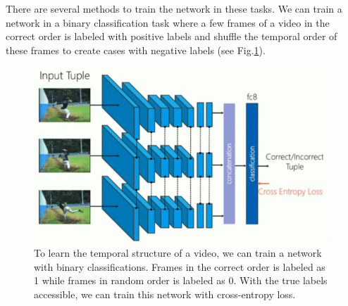 There are several methods to train the network in these tasks.
We can train a network in a binary classification task where a few frames of a video in the correct order is labeled with positive labels and shuffle the temporal order of these frames to create cases with negative labels (see Fig.\ref{fig:shuffle-learn}). 


\begin{figure}[H]
  \includegraphics[width=\linewidth]{lectures/13-a/shuffle-learn.png}
    \caption{To learn the temporal structure of a video, we can train a network with binary classifications. 
    Frames in the correct order is labeled as 1 while frames in random order is labeled as 0.
  With the true labels accessible, we can train this network with cross-entropy loss.}
  \label{fig:shuffle-learn}
\end{figure}

